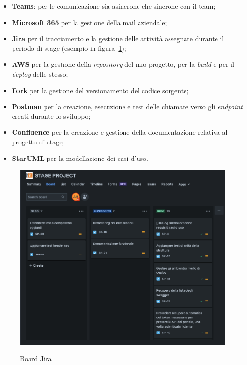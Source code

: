 \begin{itemize}
  \item \textbf{Teams}: per le comunicazione sia asincrone che sincrone con il team;
  \item \textbf{Microsoft 365} per la gestione della mail aziendale;
  \item \textbf{Jira} per il tracciamento e la gestione delle attività assegnate durante il periodo di stage (esempio in figura~\ref{fig:board-jira});
  \item \textbf{AWS} per la gestione della \textit{repository} del mio progetto, per la \textit{build} e per il \textit{deploy} dello stesso;
  \item \textbf{Fork} per la gestione del versionamento del codice sorgente;
  \item \textbf{Postman} per la creazione, esecuzione e test delle chiamate verso gli \textit{endpoint} creati durante lo sviluppo;
  \item \textbf{Confluence} per la creazione e gestione della documentazione relativa al progetto di stage;
  \item \textbf{StarUML} per la modellazione dei casi d'uso.
\end{itemize}

\begin{figure}[!ht] 
  \centering 
  \includegraphics[width=0.9\columnwidth, alt={Esempio di utilizzo della board di Jira}]{images/Board.jpg}
  \caption{Board Jira}\label{fig:board-jira}
\end{figure}

